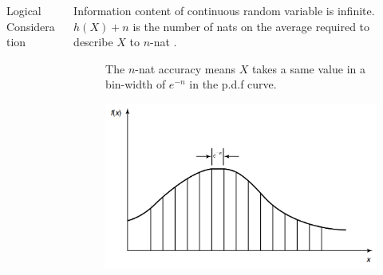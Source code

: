\documentclass[final]{beamer}
\newlength{\onecolwid}
\begin{document}
\begin{frame}[t]
\begin{columns}[t]
\begin{column}{\onecolwid}
\begin{block}{Logical Consideration}
\end{block}





 


\end{column} %


\begin{column}{\onecolwid} %

\begin{block}{}
Information content of continuous random variable is infinite. $h(X)+n$ is the number of nats on the average required to describe $X$ to $n$-nat \cite{cover2012elements}. 
 
 \begin{figure}
\begin{minipage}{0.48\linewidth}
The $n$-nat accuracy means $X$ takes a same value in a bin-width of $e^{-n}$ in the p.d.f curve.
 
\end{minipage}
\hfill
\begin{minipage}{.48\linewidth}
  \centerline{\includegraphics[width=12.8cm]{Quantization.png}}
 

\end{minipage}
\end{figure}
\end{block}
\end{column}
\end{columns}
\end{frame}
\end{document}
